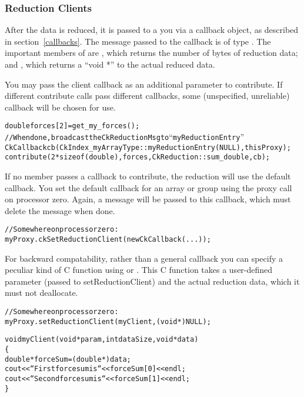 \subsubsection{Reduction Clients}
\label{reductionClients}

After the data is reduced, it is passed to a you via a callback object,
as described in section~\ref{callbacks}.  The message passed to
the callback is of type .
The important members of  are
, which returns the number of bytes of reduction data; and
, which returns a ``void *'' to the actual reduced data.

You may pass the client callback as an additional parameter to contribute.
If different contribute calls pass different callbacks, some (unspecified,
unreliable) callback will be chosen for use.
\begin{alltt}
    double forces[2]=get_my_forces();
    //When done, broadcast the CkReductionMsg to ``myReductionEntry''
    CkCallback cb(CkIndex_myArrayType::myReductionEntry(NULL),thisProxy);
    contribute(2*sizeof(double),forces,CkReduction::sum_double,cb);
\end{alltt}


If no member passes a callback to contribute, the reduction will use
the default callback. You set the default callback for an array or group
using the  proxy call on processor zero.
Again, a  message will be passed to this callback,
which must delete the message when done.

\begin{alltt}
    //Somewhere on processor zero:
    myProxy.ckSetReductionClient(new CkCallback(...));
\end{alltt}


For backward compatability, rather than a general callback you can
specify a peculiar kind of C function using 
or .  This C function takes a user-defined
parameter (passed to setReductionClient) and the actual reduction data,
which it must not deallocate.

\begin{alltt}
  //Somewhere on processor zero:
  myProxy.setReductionClient(myClient,(void *)NULL);

void myClient(void *param,int dataSize,void *data)
\{
  double *forceSum=(double *)data;
  cout<<``First force sum is ``<<forceSum[0]<<endl;
  cout<<``Second force sum is ``<<forceSum[1]<<endl;
\}
\end{alltt}



